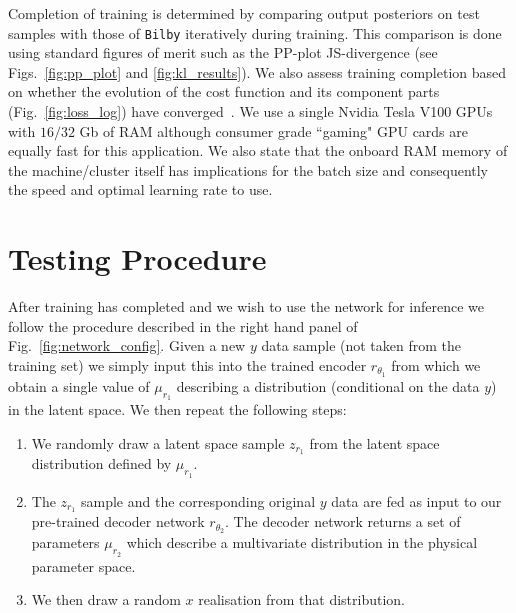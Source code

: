 %
%
Completion of training is determined by comparing output posteriors on 
test samples with those of \texttt{Bilby} iteratively during 
training. This comparison is done using standard figures of merit such as 
the \ac{PP}-plot \ac{JS}-divergence (see Figs.~\ref{fig:pp_plot} 
and \ref{fig:kl_results}). We also assess training completion based on 
whether the evolution of the cost function and its component parts
(Fig.~\ref{fig:loss_log}) have converged~. We use a single Nvidia Tesla V100 \acp{GPU} with $16/32$ Gb of RAM although consumer grade ``gaming" \ac{GPU} cards are equally fast for this application. 
We also state that the onboard RAM memory of the machine/cluster itself 
has implications for the batch size and consequently the speed and 
optimal learning rate to use.

\section{Testing Procedure}
%
%
After training has completed and we wish to use the network for inference 
we follow the procedure described in the right hand panel 
of Fig.~\ref{fig:network_config}. Given a new $y$ data sample 
(not taken from the training set) we simply input this into the trained 
encoder $r_{\theta_1}$ from which we obtain a single value of 
$\mu_{r_1}$ describing a distribution (conditional on the data $y$) 
in the latent space. We then repeat the following steps:

%
%
\begin{enumerate}
%
\item We randomly draw a latent space sample $z_{r_1}$ 
from the latent space distribution defined by $\mu_{r_1}$.
%
\item The $z_{r_1}$ sample and the corresponding original $y$ 
data are fed as input to our pre-trained decoder network 
$r_{\theta_2}$. The decoder network returns a set of 
parameters $\mu_{r_2}$ which describe a multivariate 
distribution in the physical parameter space.
%
\item We then draw a random $x$ realisation from that distribution.
%
\end{enumerate}
%


